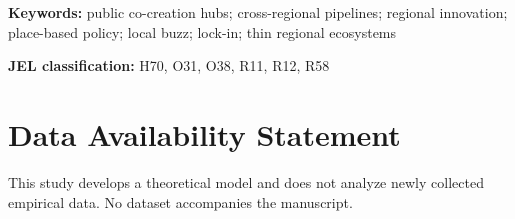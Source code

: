 \documentclass[12pt]{article}
\theoremstyle{plain}
\theoremstyle{remark}
\newcommand{\JELcodes}{H70, O31, O38, R11, R12, R58}
\newcommand{\keywordslist}{public co-creation hubs; cross-regional pipelines; regional innovation; place-based policy; local buzz; lock-in; thin regional ecosystems}
\begin{document}
\vspace{0.8em}
\noindent\textbf{Keywords:} \keywordslist

\vspace{0.35em}
\noindent\textbf{JEL classification:} \JELcodes

\vspace{1.0em}












\section*{Data Availability Statement}
This study develops a theoretical model and does not analyze newly collected empirical data. No dataset accompanies the manuscript.



\appendix




\end{document}
